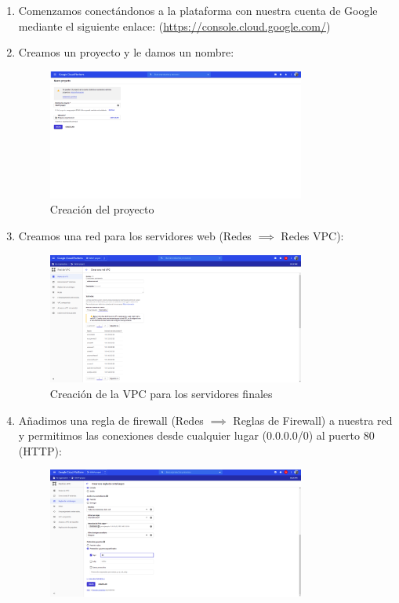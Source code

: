 \documentclass[12pt,spanish]{article}
\begin{document}
\begin{enumerate}
	\item Comenzamos conectándonos a la plataforma con nuestra cuenta de Google mediante el siguiente enlace: (\href{https://console.cloud.google.com/}{https://console.cloud.google.com/})
	\item Creamos un proyecto y le damos un nombre:
	\begin{figure}[H]
		\centering
		\includegraphics[width=0.8\textwidth]{project/create_project.png}
		\caption{Creación del proyecto}
	\end{figure}
	\item Creamos una red para los servidores web (Redes $\implies$ Redes VPC):
	\begin{figure}[H]
		\centering
		\includegraphics[width=0.8\textwidth]{project/vpc_creation.png}
		\caption{Creación de la VPC para los servidores finales}
	\end{figure}
	\newpage
	\item Añadimos una regla de firewall (Redes $\implies$ Reglas de Firewall) a nuestra red y permitimos las conexiones desde cualquier lugar (0.0.0.0/0) al puerto 80 (HTTP):
		\begin{figure}[H]
			\centering
			\includegraphics[width=0.8\textwidth]{project/firewall_creation.png}

\end{figure}
\end{enumerate}
\end{document}

